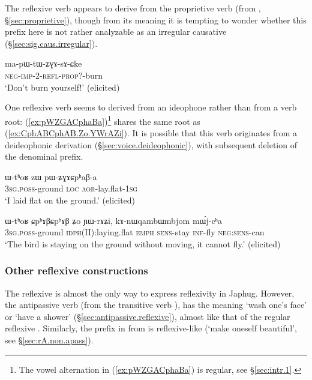 The reflexive verb  appears to derive from the proprietive verb  (from , §\ref{sec:proprietive}), though from its meaning it is tempting to wonder whether this prefix  here is not rather analyzable as an irregular causative (§\ref{sec:sig.caus.irregular}).

\begin{exe}
\ex \label{ex:mapWtWZGAsACke}
\gll ma-pɯ-tɯ-ʑɣɤ-sɤ-ɕke \\
\textsc{neg}-\textsc{imp}-2-\textsc{refl}-\textsc{prop}?-burn \\
\glt `Don't burn yourself!' (elicited)
\end{exe}
  
One reflexive verb seems to derived from an ideophone rather than from a verb root:  (\ref{ex:pWZGACphaBa})\footnote{The vowel alternation in (\ref{ex:pWZGACphaBa}) is regular, see §\ref{sec:intr.1}. } shares the same root  as  (\ref{ex:CphABCphAB.Zo.YWrAZi}). It is possible that this verb originates from a deideophonic derivation (§\ref{sec:voice.deideophonic}), with subsequent deletion of the denominal prefix.

\begin{exe}
\ex \label{ex:pWZGACphaBa}
\gll  ɯ-tʰoʁ zɯ pɯ-ʑɣɤɕpʰaβ-a \\
\textsc{3sg}.\textsc{poss}-ground \textsc{loc} \textsc{aor}-lay.flat-\textsc{1sg} \\
\glt `I laid flat on the ground.' (elicited)
\end{exe}

\begin{exe}
\ex \label{ex:CphABCphAB.Zo.YWrAZi}
\gll   ɯ-tʰoʁ ɕpʰɤβɕpʰɤβ ʑo ɲɯ-rɤʑi, kɤ-nɯqambɯmbjom mɯ́j-cʰa \\
\textsc{3sg}.\textsc{poss}-ground \textsc{idph}(II):laying.flat \textsc{emph} \textsc{sens}-stay \textsc{inf}-fly \textsc{neg}:\textsc{sens}-can \\
\glt `The bird is staying on the ground without moving, it cannot fly.' (elicited)
\end{exe}
 
  \subsubsection{Other reflexive constructions} \label{sec:refl.other}
The reflexive  is almost the only way to express reflexivity in Japhug. However, the antipassive verb  (from the transitive verb ), has the meaning `wash one's face' or `have a shower' (§\ref{sec:antipassive.reflexive}), almost like that of the regular reflexive . Similarly, the prefix  in   from  is reflexive-like (`make oneself beautiful', see §\ref{sec:rA.non.apass}).
 
